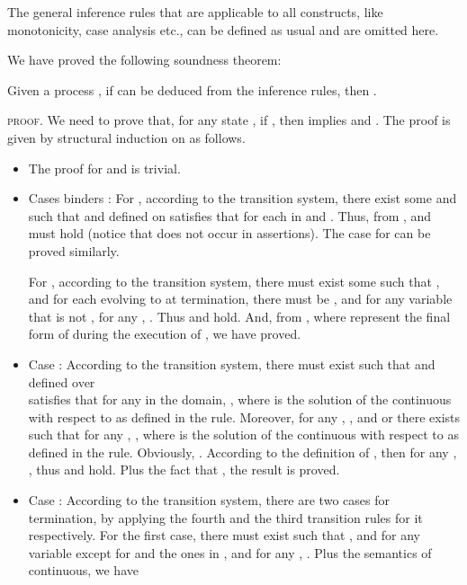 \documentclass{llncs}
\begin{document}
The general inference rules that are applicable to all constructs, like monotonicity, case analysis etc.,
can be defined as usual and are omitted here.

We have proved the following soundness theorem:
\begin{theorem}
Given a process , if  can be deduced from the inference rules,
then .
\end{theorem}
 \textsc{proof}.
We need to prove that, for any state , if , then  implies
 and . The proof is given by structural induction on  as follows.
  \begin{itemize}
    \item The proof for   and  is trivial.

    \item Cases binders : For ,  according to the transition system, there exist some  and  such
    that
     and 
    defined on  satisfies that  for
    each  in  and .
    Thus, from , 
    and  must hold (notice that  does not occur
    in assertions). The case for 
    can be proved similarly.

  For , according to the transition system,
    there must exist some  such that , and
    for each  evolving to  at termination, there must be , and
    for any variable  that is not , for any
    , . Thus
     and  hold. And, from , where  represent the final form of  during the execution of , we have  proved.

    \item Case : According to the transition system,
    there must exist  such that   and
     defined over \\
     satisfies that
    for any  in the domain,  , where
     is the solution of the continuous with respect to  as defined in the rule.
   Moreover, for any ,
    , and  or there exists  such that
    for any ,
    ,
    where
     is the solution of the continuous with respect to  as defined in the rule.
    Obviously, . According to the definition
    of , then for any ,
    , thus
     and 
     hold.
    Plus the fact that 
    , the result is proved.

    \item Case : According to the transition system, there are two
    cases for termination, by applying the fourth and the third transition rules for it respectively.
    For the first case, there must exist  such that ,
    and for any variable  except for  and the ones in , 
    and for any , . Plus the semantics of
    continuous, we have
    

\end{itemize}
\end{document}
